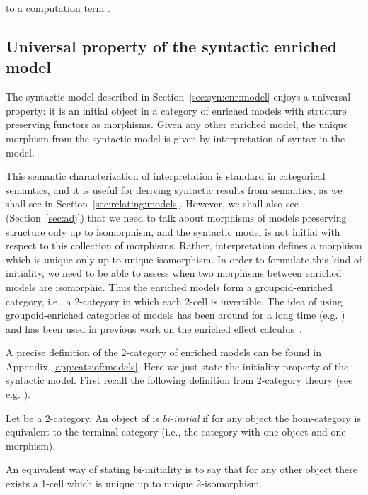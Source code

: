 \documentclass{LMCS}
\begin{document}
to a computation term
.

\subsection{Universal property of the syntactic enriched model}
\label{sec:enr:model:biinitial}

The syntactic model described in Section~\ref{sec:syn:enr:model} enjoys a universal property:
it is an initial object 
in a category of enriched models with structure preserving
functors as morphisms. Given any other enriched model, the unique morphism
from the syntactic model is given by interpretation of syntax in the model.


This semantic characterization 
of interpretation is standard in categorical semantics, and it
is useful for deriving syntactic results from semantics, as we shall see
in Section~\ref{sec:relating:models}. 
However, we shall also see (Section~\ref{sec:adj})
that we need to talk about morphisms of models preserving structure only 
up to isomorphism, and the syntactic model is not initial with respect 
to this collection of morphisms. Rather, interpretation defines a morphism
which is unique only up to unique isomorphism. In order to formulate
this kind of initiality, we need to be able to assess when 
two morphisms between enriched models are isomorphic.
Thus the enriched models
form a 
groupoid-enriched category,
i.e., a 2-category in which each 2-cell is invertible.
The idea of using groupoid-enriched 
categories of models has been around for a long time 
(e.g. \cite[\S 8]{dk-alggraph})
and has been used in previous work on the enriched effect 
calculus~\cite{Mogelberg:CSL:09,Mogelberg:fossacs:10}. 

A precise definition of the 2-category of enriched models  can be found in 
Appendix~\ref{app:cats:of:models}. Here we just state the initiality property of the syntactic model.
First recall the following definition from 2-category theory 
(see e.g. \cite[\S6]{k-twocatlimits}).

\begin{defi} \label{def:biinitial}
Let  be a 2-category. An object  of  is \emph{bi-initial} if
for any object  the hom-category  is equivalent to 
the terminal category (i.e., the category with one object and one morphism).
\end{defi}
An equivalent way of stating bi-initiality is to say that 
for any other object  
there exists a 1-cell 
which is unique up to unique 2-isomorphism.
\end{document}
